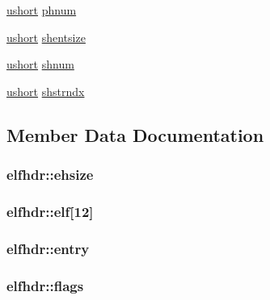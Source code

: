 \begin{DoxyCompactItemize}
\item 
\hyperlink{custom__types_8h_ab95f123a6c9bcfee6a343170ef8c5f69}{ushort} \hyperlink{structelfhdr_a3eff58d58a3ee83aa53d7ffdebdb6b5b}{phnum}
\item 
\hyperlink{custom__types_8h_ab95f123a6c9bcfee6a343170ef8c5f69}{ushort} \hyperlink{structelfhdr_aeedc5375e3f67e8dda6351e0e80b8e02}{shentsize}
\item 
\hyperlink{custom__types_8h_ab95f123a6c9bcfee6a343170ef8c5f69}{ushort} \hyperlink{structelfhdr_aebf9526933b9f0502bdbafacce3734c1}{shnum}
\item 
\hyperlink{custom__types_8h_ab95f123a6c9bcfee6a343170ef8c5f69}{ushort} \hyperlink{structelfhdr_a84f3d7712c99bfea3f4be42728dc0a0e}{shstrndx}
\end{DoxyCompactItemize}


\subsection{Member Data Documentation}
\subsubsection[{\texorpdfstring{ehsize}{ehsize}}]{ elfhdr\+::ehsize}\hypertarget{structelfhdr_aeffe5743cc720e5795af5d17b6fd6928}{}\label{structelfhdr_aeffe5743cc720e5795af5d17b6fd6928}
\subsubsection[{\texorpdfstring{elf}{elf}}]{ elfhdr\+::elf\mbox{[}12\mbox{]}}\hypertarget{structelfhdr_a22ec6f2383f0488ee18a18673398f201}{}\label{structelfhdr_a22ec6f2383f0488ee18a18673398f201}
\subsubsection[{\texorpdfstring{entry}{entry}}]{ elfhdr\+::entry}\hypertarget{structelfhdr_ad40755e1b2c6efc3ec0ad95889f743a5}{}\label{structelfhdr_ad40755e1b2c6efc3ec0ad95889f743a5}
\subsubsection[{\texorpdfstring{flags}{flags}}]{ elfhdr\+::flags}\hypertarget{structelfhdr_a2f1e0957c83938630ef0ed074830df03}{}\label{structelfhdr_a2f1e0957c83938630ef0ed074830df03}
